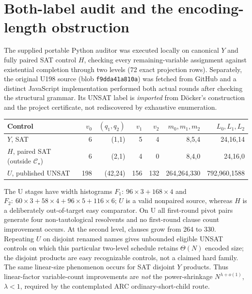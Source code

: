 \documentclass[11pt]{article}
\newcommand{\CS}{\mathcal C_\star}
\begin{document}
\section{Both-label audit and the encoding-length obstruction}
The supplied portable Python auditor was executed locally on
canonical \(Y\) and fully paired SAT control \(H\), checking
every remaining-variable assignment against existential
completion through two levels (72 exact projection rows).
Separately, the original U198 source
(blob \texttt{f9dda41a810a}) was fetched from GitHub and a distinct
JavaScript implementation performed both actual rounds after checking
the structural grammar. Its UNSAT label is \emph{imported} from
D\"ocker's construction and the project certificate, not rediscovered
by exhaustive enumeration.

\begin{center}\small
\begin{tabular}{@{}lrrrrrr@{}}
\toprule
Control & \(v_0\) & \((q_1,q_2)\) & \(v_1\) & \(v_2\) & \(m_0,m_1,m_2\)& \(L_0,L_1,L_2\)\\
\midrule
\(Y\), SAT &6&(1,1)&5&4&8,5,4&24,16,14\\
\(H\), paired SAT (outside \(\CS\)) &6&(2,1)&4&0&8,4,0&24,16,0\\
\(U\), published UNSAT &198&(42,24)&156&132&264,264,330&792,960,1588\\
\bottomrule
\end{tabular}
\end{center}
The U stages have width histograms
\(F_1:\ 96\times3+168\times4\) and
\(F_2:\ 60\times3+58\times4+96\times5+116\times6\);
\(U\) is a valid nonpaired source, whereas \(H\) is a deliberately
out-of-target easy comparator. On U all first-round pivot pairs
generate four non-tautological resolvents and no first-round
clause count improvement occurs. At the second level, clauses
grow from 264 to 330. Repeating \(U\) on disjoint renamed names
gives unbounded eligible UNSAT controls on which this particular
two-level schedule retains \(\Theta(N)\) encoded size; the disjoint
products are easy recognizable controls, not a claimed hard family.
The same linear-size phenomenon occurs for SAT disjoint \(Y\)
products. Thus linear-factor variable-count improvements are
\emph{not} the power-shrinkage \(N^{\lambda+o(1)}\), \(\lambda<1\),
required by the contemplated ARC ordinary-short-child route.
\end{document}
